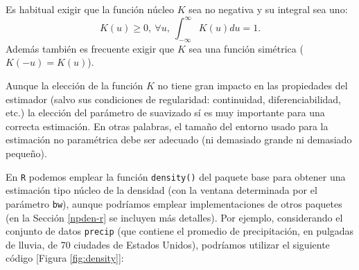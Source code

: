 \documentclass[
]{book}
\newenvironment{Shaded}{\begin{snugshade}}{\end{snugshade}}
\newcommand{\AttributeTok}[1]{\textcolor[rgb]{0.13,0.29,0.53}{#1}}
\newcommand{\CommentTok}[1]{\textcolor[rgb]{0.56,0.35,0.01}{\textit{#1}}}
\newcommand{\ConstantTok}[1]{\textcolor[rgb]{0.56,0.35,0.01}{#1}}
\newcommand{\DecValTok}[1]{\textcolor[rgb]{0.00,0.00,0.81}{#1}}
\newcommand{\FloatTok}[1]{\textcolor[rgb]{0.00,0.00,0.81}{#1}}
\newcommand{\FunctionTok}[1]{\textcolor[rgb]{0.13,0.29,0.53}{\textbf{#1}}}
\newcommand{\NormalTok}[1]{#1}
\newcommand{\OtherTok}[1]{\textcolor[rgb]{0.56,0.35,0.01}{#1}}
\newcommand{\SpecialCharTok}[1]{\textcolor[rgb]{0.81,0.36,0.00}{\textbf{#1}}}
\newcommand{\StringTok}[1]{\textcolor[rgb]{0.31,0.60,0.02}{#1}}
\theoremstyle{break}
\theoremstyle{nonumberplain}
\renewcommand{\CommentTok}[1]{\textcolor[rgb]{0.41,0.41,0.41}{\texttt{#1}}}
\begin{document}
Es habitual exigir que la función núcleo \(K\) sea no negativa y su
integral sea uno:
\[K\left( u \right) \geq 0,~\forall u,~\int_{-\infty }^{\infty }K\left(u \right) du=1.\]
Además también es frecuente exigir que \(K\) sea una
función simétrica (\(K\left( -u \right) =K\left( u \right)\)).

Aunque la elección de la función \(K\) no tiene gran impacto en las
propiedades del estimador (salvo sus condiciones de regularidad:
continuidad, diferenciabilidad, etc.) la elección del parámetro de
suavizado sí es muy importante para una correcta estimación. En otras
palabras, el tamaño del entorno usado para la estimación no paramétrica
debe ser adecuado (ni demasiado grande ni demasiado pequeño).

En \texttt{R} podemos emplear la función \texttt{density()} del paquete base para obtener
una estimación tipo núcleo de la densidad (con la ventana determinada
por el parámetro \texttt{bw}), aunque podríamos emplear implementaciones de otros
paquetes (en la Sección \ref{npden-r} se incluyen más detalles).
Por ejemplo, considerando el conjunto de datos \texttt{precip} (que contiene el promedio de precipitación, en pulgadas de lluvia, de 70 ciudades de Estados Unidos), podríamos utilizar el siguiente código {[}Figura \ref{fig:density}{]}:

\begin{Shaded}
\end{Shaded}
\end{document}

